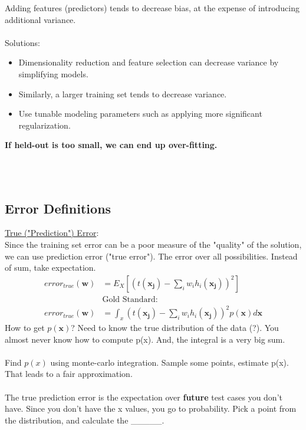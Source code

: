 Adding features (predictors) tends to decrease bias, at the expense of introducing additional variance.   \hfill \\
\hfill \\

Solutions:
\begin{itemize}
	\item Dimensionality reduction and feature selection can decrease variance by simplifying models. 
	\item Similarly, a larger training set tends to decrease variance. 
	\item Use tunable modeling parameters such as applying more significant regularization.
\end{itemize}

\textbf{If held-out is too small, we can end up over-fitting.}


\hfill \\  \hfill \\

\subsection{Error Definitions}

\underline{True ("Prediction") Error}:   \hfill \\
Since the training set error can be a poor measure of the "quality" of the solution, we can use prediction error ("true error").  
The error over all possibilities.   Instead of sum, take expectation. 
\begin{align*}
	error_{true}(\bm{w}) &= E_X[(t(\bm{x_j})-\sum_{i} w_i h_i(\bm{x_j}))^2] \\
		& \mbox{Gold Standard:} \\
	error_{true}(\bm{w}) &= \int_x (t(\bm{x_j})-\sum_{i} w_i h_i(\bm{x_j}))^2 p(\bm{x}) d\bm{x}
\end{align*}
How to get $p(\bm{x})$?  Need to know the true distribution of the data (?).  
You almost never know how to compute p(x).
And, the integral is a very big sum. \hfill \\  \hfill \\

Find $p(x)$ using monte-carlo integration. 
Sample some points, estimate p(x).  
That leads to a fair approximation.  \hfill \\  \hfill \\

The true prediction error is the expectation over \textbf{future} test cases you don't have.  
Since you don't have the x values, you go to probability. 
Pick a point from the distribution, and calculate the \_\_\_\_\_.     \hfill \\  \hfill \\

